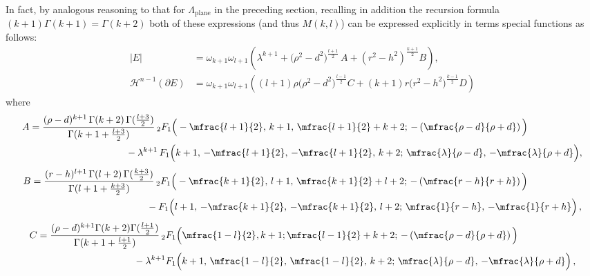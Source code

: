 \documentclass[10pt,reqno]{amsart}
\numberwithin{equation}{section}
\theoremstyle{definition}
\DeclareMathOperator{\plane}{plane}
\begin{document}
{{In fact, {by analogous reasoning to that for $\Lambda_{\plane}$ in the preceding section, recalling in addition the recursion formula $(k+1)\Gamma(k+1) = \Gamma(k+2)$} both of these expressions (and thus $M(k,l)$) can be expressed explicitly in terms special functions as follows:
\begin{align}\label{eqn: lawson competitor volume}
|E| &=  \omega_{k+1}\omega_{l+1}\left( {\lambda^{k+1}} + \big(\rho^2 - d^2\big)^{\frac{l+1}{2}} \, A +{(r^2-h^2)}^{\frac{k+1}{2}}B \right),\\
\label{eqn: lawson competitor perimeter}
\mathcal{H}^{n-1}(\partial E)  & = \omega_{k+1}\omega_{l+1} \left( (l+1)\rho \big( \rho^2 - d^2 \big)^{\frac{l-1}{2}} C + (k+1)r \big(r^2-h^2 \big)^{\frac{k-1}{2}}  D\right)
\end{align}
where 
\begin{align}
\begin{split}
\label{eqn: term A} A& =  
    \frac{ (\rho -d)^{k+1} \, \Gamma(k+2)\, \Gamma(\frac{l+3}{2})}{\Gamma(k+1 + \frac{l+3}{2})} \,  {}_2F_1\Big(-\mfrac{l+1}{2},\, k+1, \,\mfrac{l+1}{2} + k +2 ; \, -\left( \mfrac{\rho - d}{\rho +d}\right) \Big)\\
     &\qquad \qquad \qquad \qquad \qquad -{\lambda^{k+1}}\,F_1 \Big(k+1 ,\,  -\mfrac{l+1}{2},\,  -\mfrac{l+1}{2},\,  k+2; \, \mfrac{\lambda}{\rho- d} ,\,  -\mfrac{\lambda}{\rho +d}\Big) ,
   \end{split} 
\end{align}
%
%
\begin{align}
\begin{split}
  \label{eqn: term B}   B& = 
    \frac{ (r-h)^{l+1} \, \Gamma(l+2)\, \Gamma (\frac{k+3}{2})}{\Gamma(l+1 +  \frac{k+3}{2})} \, {}_2F_1 \Big( -\mfrac{k+1}{2},\, l+1,\, \mfrac{k+1}{2} + l +2 ; \, - \left(\mfrac{r-h}{r+h}\right)\Big)\\
  & \qquad \qquad \qquad \qquad \qquad \qquad
    - F_1\Big(l+1,\,  -\mfrac{k+1}{2}, \, -\mfrac{k+1}{2},\,  l+2; \, \mfrac{1}{r-h}, \, -\mfrac{1}{r+h}\Big)\,,
\end{split}
\end{align}
\begin{align}
\begin{split}
    \label{eqn: term C} 
        C & = \frac{(\rho-d)^{k+1} \Gamma(k+2)\Gamma(\frac{l+1}{2})}{\Gamma(k+1+ \frac{l+1}{2})} \, {}_2F_1\Big(\mfrac{1-l}{2} , k+1; \mfrac{l-1}{2} + k+2;\, -\left( \mfrac{\rho -d}{\rho+ d}\right) \Big)\\
    & \qquad \qquad\qquad \qquad \qquad - \lambda^{k+1}F_1\Big(k+1, \, \mfrac{1-l}{2}, \, \mfrac{1-l}{2}, \, k+2 ; \,\mfrac{\lambda}{\rho- d}, \, - \mfrac{\lambda}{\rho+ d} \Big)\,,

\end{split}
\end{align}}}
\end{document}
